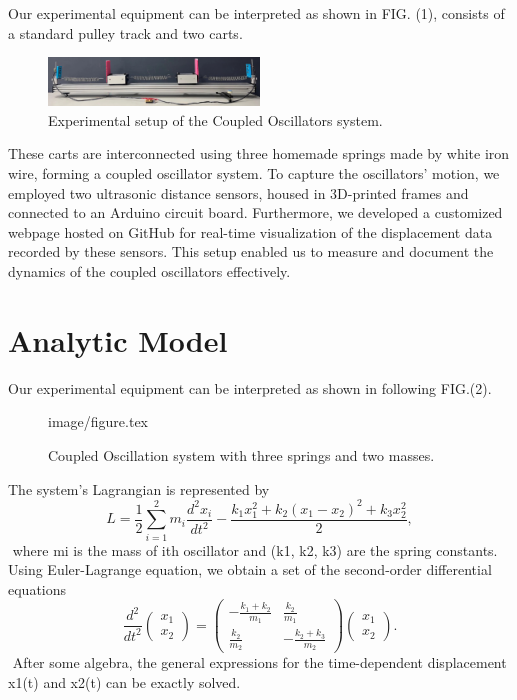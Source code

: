 \documentclass[12pt, a4paper]{article}%
\begin{document}
Our experimental equipment can be interpreted as shown in FIG. (1), consists of a standard pulley track and two carts. 
	\begin{figure}[h]
	\centering
	\includegraphics[width=0.5\textwidth]{../paper/image/system_cleanup.jpg}
	\caption{Experimental setup of the Coupled Oscillators system.}
	\label{fig:exp-system}
	\end{figure}
These carts are interconnected using three homemade springs made by white iron wire, forming a coupled oscillator system. To capture the oscillators' motion, we employed two ultrasonic distance sensors, housed in 3D-printed frames and connected to an Arduino circuit board. Furthermore, we developed a customized webpage hosted on GitHub for real-time visualization of the displacement data recorded by these sensors. This setup enabled us to measure and document the dynamics of the coupled oscillators effectively.

\section{Analytic Model}
Our experimental equipment can be interpreted as shown in following FIG.(2).  	\begin{figure}[h]\centering
	{image/figure.tex}
	\caption{Coupled Oscillation system with three springs and two masses.}
	\label{fig:system}
	\end{figure}
The system's Lagrangian is represented by 
\begin{equation}
	L = \frac{1}{2}\sum_{i=1}^{2}m_i \frac{d^2x_i}{dt^2}
		-\frac{k_1x_1^2+k_2\left(x_1-x_2\right)^2+k_3x_2^2}{2},
	\end{equation} where mi is the mass of ith oscillator and (k1, k2, k3) are the spring constants. Using Euler-Lagrange equation, we obtain a set of the second-order differential equations 	\begin{equation}
	\frac{d^2}{dt^2}\begin{pmatrix}x_1\\ x_2\end{pmatrix} =
	\begin{pmatrix}
	\displaystyle - \frac{k_1+k_2}{m_1}	&\displaystyle  \frac{k_2}{m_1}\\
	\displaystyle  \frac{k_2}{m_2} 		&\displaystyle  -\frac{k_2+k_3}{m_2}
	\end{pmatrix}
	\begin{pmatrix}x_1\\ x_2\end{pmatrix}.
	\end{equation} After some algebra, the general expressions for the time-dependent displacement x1(t) and x2(t) can be exactly solved.
\end{document}
